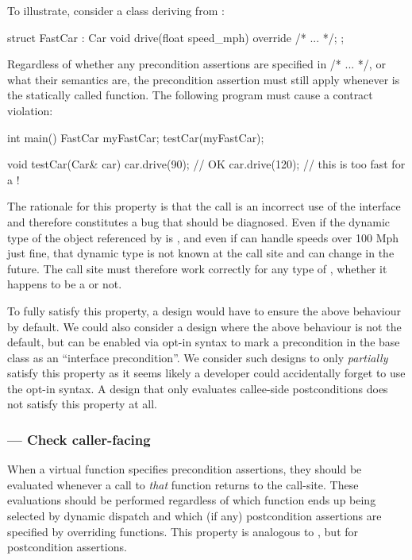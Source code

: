 To illustrate, consider a class deriving from :

\begin{codeblock}
struct FastCar : Car {
  void drive(float speed_mph) override
    /* ... */;
};
\end{codeblock}

Regardless of whether any precondition assertions are specified in /* ... */, or what their semantics are, the precondition assertion \mbox{} must still apply whenever  is the statically called function. The following program must cause a contract violation:

\begin{codeblock}
int main() {
  FastCar myFastCar;
  testCar(myFastCar);
}

void testCar(Car& car) {
  car.drive(90); // OK
  car.drive(120); // this is too fast for a !
}
\end{codeblock}

The rationale for this property is that the call \mbox{} is an incorrect use of the  interface and therefore constitutes a bug that should be diagnosed. Even if the dynamic type of the object referenced by  is , and even if  can handle speeds over 100 Mph just fine, that dynamic type is not known at the call site and can change in the future. The call site must therefore work correctly for any type of , whether it happens to be a  or not.

To fully satisfy this property, a design would have to ensure the above behaviour by default. We could also consider a design where the above behaviour is not the default, but can be enabled via opt-in syntax to mark a precondition in the base class as an ``interface precondition''. We consider such designs to only \emph{partially} satisfy this property as it seems likely a developer could accidentally forget to use the opt-in syntax.  A design that only evaluates callee-side postconditions does not satisfy this property at all.

\subsubsection{ --- Check caller-facing }

When a virtual function specifies precondition assertions, they should be evaluated whenever a call to \emph{that} function returns to the call-site. These evaluations should be performed regardless of which function ends up being selected by dynamic dispatch and which (if any) postcondition assertions are specified by overriding functions. This property is analogous to , but for postcondition assertions.

